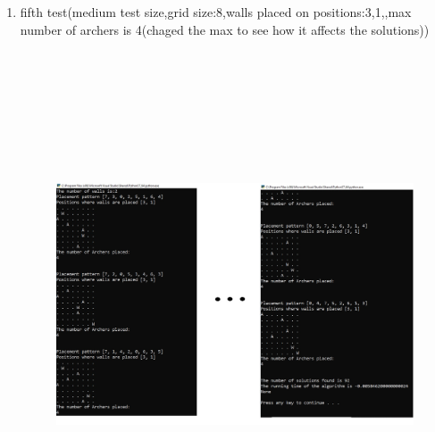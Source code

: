 \documentclass{article}
\begin{document}
\begin{enumerate}
\newpage
\item fifth test(medium test size,grid size:8,walls placed on positions:3,1,,max number of archers is 4(chaged the max to see how it affects the solutions))
\begin{figure}[h]
\includegraphics[width=12 cm, height=15cm]{test5}
\end{figure}



\end{enumerate}
\end{document}
